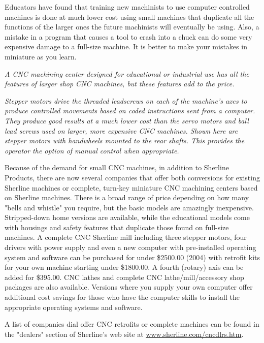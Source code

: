 
Educators have found that training new machinists to use computer controlled
machines is done at much lower cost using small machines that duplicate all the
functions of the larger ones the future machinists will eventually be using.
Also, a mistake in a program that causes a tool to crash into a chuck can do
some very expensive damage to a full-size machine. It is better to make your
mistakes in miniature as you learn.

\bigskip
\textit{A CNC machining center designed for educational or industrial use has
all the features of larger shop CNC machines, but these features add to the
price.}
\bigskip

\textit{Stepper motors drive the threaded leadscrews on each of the machine's
axes to produce controlled movements based on coded instructions sent from a
computer. They produce good results at a much lower cost than the servo motors
and ball lead screws used on larger, more expensive CNC machines. Shown here are
stepper motors with handwheels mounted to the rear shafts. This provides the
operator the option of manual control when appropriate.}
\bigskip


Because of the demand for small CNC machines, in addition to Sherline Products,
there are now several companies that offer both conversions for existing
Sherline machines or complete, turn-key miniature CNC machining centers based on
Sherline machines. There is a broad range of price depending on how many "bells
and whistle" you require, but the basic models are amazingly inexpensive.
Stripped-down home versions are available, while the educational models come
with housings and safety features that duplicate those found on full-size
machines. A complete CNC Sherline mill including three stepper motors, four
drivers with power supply and even a new computer with pre-installed operating
system and software can be purchased for under \$2500.00 (2004) with retrofit
kits for your own machine starting under \$1800.00. A fourth (rotary) axis can
be added for \$395.00. CNC lathes and complete CNC lathe/mill/accessory shop
packages are also available. Versions where you supply your own computer offer
additional cost savings for those who have the computer skills to install the
appropriate operating systems and software.

A list of companies dial offer CNC retrofits or complete machines can be found
in the "dealers" section of Sherline's web site at
\url{www.sherline.com/cncdlrs.htm}.


